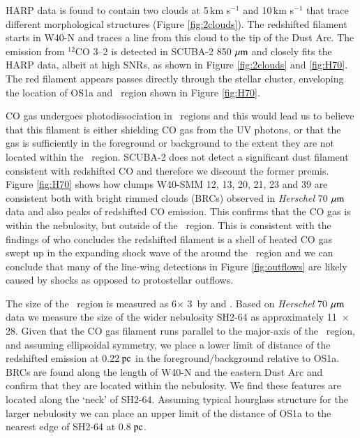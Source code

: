 
HARP data is found to contain two clouds at 5\,km s$^{-1}$ and 10\,km s$^{-1}$ 
that trace different morphological structures (Figure \ref{fig:2clouds}). The redshifted 
filament starts in W40-N and traces a line from this cloud to the tip of the Dust Arc. 
The emission from $^{12}$CO 3\hbox{--}2 is detected in SCUBA-2 850\,$\,\mu\rm{m}$ 
and closely fits the HARP data, albeit at high SNRs, as shown in Figure \ref{fig:2clouds} 
and \ref{fig:H70}. The red filament appears passes directly through the stellar cluster, 
enveloping the location of OS1a and \HII\ region shown in Figure \ref{fig:H70}. 

CO gas undergoes photodissociation in \HII\ regions and this would lead us to 
believe that this filament is either shielding CO gas from the UV photons, or that 
the gas is sufficiently in the foreground or background to the extent they are not 
located within the \HII\ region. SCUBA-2 does not detect a significant dust filament 
consistent with redshifted CO and therefore we discount the former premis. 
Figure \ref{fig:H70} shows how clumps W40-SMM 12, 13, 20, 21, 23 and 39 are 
consistent both with bright rimmed clouds (BRCs) observed in \emph{Herschel} 
70\,$\,\mu\rm{m}$ data and also peaks of redshifted CO emission. This confirms that 
the CO gas is within the nebulosity, but outside of the \HII\ region. This is consistent 
with the findings of \cite{Shimoikura:2015kx} who concludes the redshifted filament 
is a shell of heated CO gas swept up in the expanding shock wave of the around 
the \HII\ region and we can conclude that many of the line-wing detections in Figure 
\ref{fig:outflows} are likely caused by shocks as opposed to protostellar outflows. 

The size of the \HII\ region is measured as 6\arcmin $\times$ 3\arcmin\ by 
\cite{Sharpless:1959hc} and \cite{Vallee:1991zr}. Based on \emph{Herschel} 
70\,$\,\mu\rm{m}$ data we measure the size of the wider nebulosity SH2-64 as 
approximately 11\arcmin\ $\times$ 28\arcmin. Given that the CO gas filament 
runs parallel to the major-axis of the \HII\ region, and assuming ellipsoidal 
symmetry, we place a lower limit of distance of the redshifted emission at 
0.22$\hbox{ pc}$ in the foreground/background relative to OS1a. BRCs are 
found along the length of W40-N and the eastern Dust Arc and confirm that 
they are located within the nebulosity. We find these features are located along 
the `neck' of SH2-64. Assuming typical hourglass structure \citep{Rodney:2008ij} 
for the larger nebulosity we can place an upper limit of the distance of OS1a to 
the nearest edge of SH2-64 at 0.8$\hbox{ pc}$.

